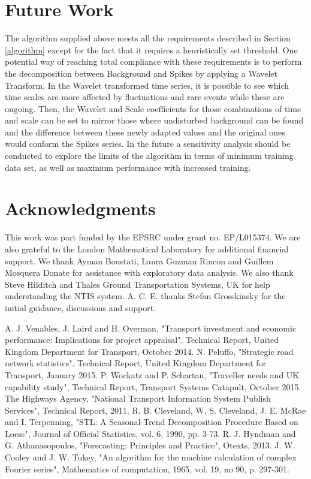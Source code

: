 \documentclass[conference]{IEEEtran}
\begin{document}
\section{Future Work}
The algorithm supplied above meets all the requirements described in Section \ref{algorithm} except for the fact that it requires a heuristically set threshold. 
One potential way of reaching total compliance with these requirements is to perform the decomposition between Background and Spikes by applying a Wavelet Transform. 
In the Wavelet transformed time series, it is possible to see which time scales are more affected by fluctuations and rare events while these are ongoing. 
Then, the Wavelet and Scale coefficients for those combinations of time and scale can be set to mirror those where undisturbed background can be found and the difference between these newly adapted values and the original ones would conform the Spikes series.
In the future a sensitivity analysis should be conducted to explore the limits of the algorithm in terms of minimum training data set, as well as maximum performance with increased training.
\section*{Acknowledgments}
This work was part funded by the EPSRC under grant no. EP/L015374. 
We are also grateful to the London Mathematical Laboratory for additional financial support. 
We thank Ayman Boustati, Laura Guzman Rincon and Guillem Mosquera Donate for assistance with exploratory data analysis. 
We also thank Steve Hilditch and Thales Ground Transportation Systems, UK for help understanding the NTIS system.  
A. C. E. thanks Stefan Grosskinsky for the initial guidance, discussions and support.


\begin{thebibliography}{00}
 A. J. Venables, J. Laird and H. Overman, "Transport investment and economic performance: Implications for project appraisal". Technical Report, United Kingdom Department for Transport, October 2014.
 N. Peluffo, "Strategic road network statistics". Technical Report, United Kingdom Department for Transport, January 2015.
 P. Wockatz and P. Schartau, "Traveller needs and UK capability study", Technical Report, Transport Systems Catapult, October 2015.
 The Highways Agency, "National Transport Information System Publish Services", Technical Report, 2011. 
 R. B. Cleveland, W. S. Cleveland, J. E. McRae and I. Terpenning, "STL: A Seasonal-Trend Decomposition Procedure Based on Loess", Journal of Official Statistics, vol. 6, 1990, pp. 3-73.
 R. J. Hyndman and G. Athanasopoulos, "Forecasting: Principles and Practice", Otexts, 2013.
 J. W. Cooley and J. W. Tukey, "An algorithm for the machine calculation of complex Fourier series", Mathematics of computation, 1965, vol. 19, no 90, p. 297-301.

\end{thebibliography}
\end{document}
